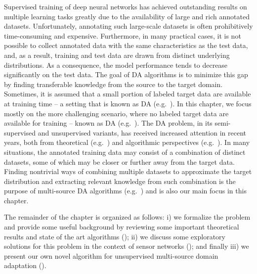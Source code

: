 Supervised training of deep neural networks has achieved outstanding results on multiple learning tasks greatly due to the availability of large and rich annotated datasets. Unfortunately, annotating such large-scale datasets is often prohibitively time-consuming and expensive. Furthermore, in many practical cases, it is not possible to collect annotated data with the same characteristics as the test data, and, as a result, training and test data are drawn from distinct underlying distributions. As a consequence, the model performance tends to decrease significantly on the test data. The goal of DA algorithms is to minimize this gap by finding transferable knowledge from the source to the target domain. Sometimes, it is assumed that a small portion of labeled target data are available at training time -- a setting that is known as  DA (e.g.\ \citet{Daume2010, Donahue2013, Kumar2010, Saito2019, Yao2015}). In this chapter, we focus mostly on the more challenging scenario, where no labeled target data are available for training -- known as  DA (e.g.\ \citet{Baktashmotlagh2013, Ganin2015, Kang2019, Long2016a, Zhao2018}). The DA problem, in its semi-supervised and unsupervised variants, has received increased attention in recent years, both from theoretical (e.g.\ \citet{BenDavid2010, BenDavid2007, Blitzer2008, Cortes2014, Gopalan2013, Hoffman2018, Zhao2019}) and algorithmic perspectives (e.g.\ \citet{Ajakan2014, Becker2013, Fernando2013, Jhuo2012, Long2015, Louizos2015, Sun2016, Tzeng2017}). In many situations, the annotated training data may consist of a combination of distinct datasets, some of which may be closer or further away from the target data. Finding nontrivial ways of combining multiple datasets to approximate the target distribution and extracting relevant knowledge from such combination is the purpose of multi-source DA algorithms (e.g.\ \citet{Kim2017, Guo2018, Hoffman2018, Mansour2009, Sebag2019, Zhang2015, Zhao2018}) and is also our main focus in this chapter.

The remainder of the chapter is organized as follows: i) we formalize the problem and provide some useful background by reviewing some important theoretical results and state of the art algorithms (); ii) we discuss some exploratory solutions for this problem in the context of sensor networks (); and finally iii) we present our own novel algorithm for unsupervised multi-source domain adaptation ().

